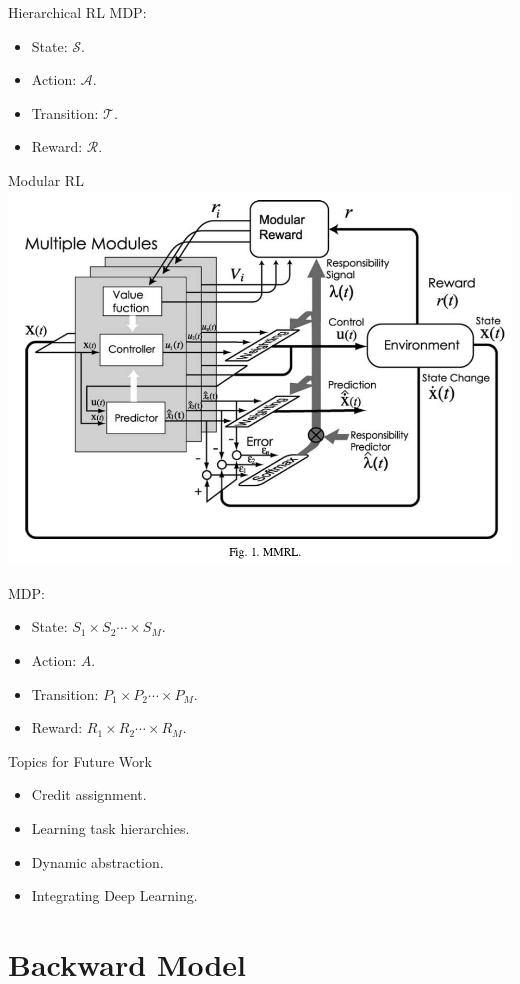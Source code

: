 Hierarchical RL
MDP:
\begin{itemize}
  \item State: {\color{red}$\mathcal{S}$}.
  \item Action: {\color{red}$\mathcal{A}$}.
  \item Transition: {\color{red}$\mathcal{T}$}.
  \item Reward: {\color{red}$\mathcal{R}$}.
\end{itemize}



Modular RL
\includegraphics[width=0.8\columnwidth]{mrl.png}



MDP:
\begin{itemize}
  \item State: {\color{red}$S_1 \times S_2 \cdots \times S_M $}.
  \item Action: $A$.
  \item Transition: {\color{red}$P_1 \times P_2 \cdots \times P_M $}.
  \item Reward: {\color{red}$R_1 \times R_2 \cdots \times R_M $}.
\end{itemize}



Topics for Future Work
\begin{itemize}
  \item Credit assignment.
  \item Learning task hierarchies.
  \item Dynamic abstraction. 
  \item Integrating Deep Learning. 
\end{itemize}

\section{Backward Model}
